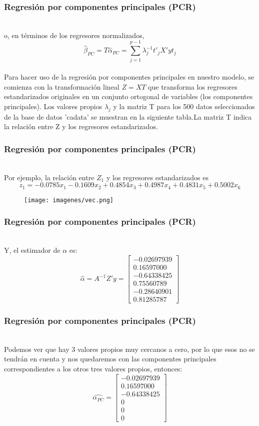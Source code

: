 \documentclass[12pt]{beamer}
\begin{document}
\begin{frame}
\frametitle{Regresión por componentes principales (PCR)}
~\\ o, en términos de los regresores normalizados,
$$\hat{\beta}_{PC}=T\hat{\alpha}_{PC}=\sum\limits_{j=1}^{p-1}\lambda_{j}^{-1}t'_{j}X'yt_{j}$$
~\\Para hacer uso de la regresión por componentes principales en nuestro modelo, se comienza con la transformación lineal $Z=XT$ que transforma los regresores estandarizados originales en un conjunto ortogonal de variables (los componentes principales). Los valores propios $\lambda_{j}$ y la matriz T para los 500 datos seleccionados de la base de datos 'cadata' se muestran en la siguiente tabla.La matriz T indica la relación entre Z y los regresores estandarizados. 
\end{frame}

\begin{frame}
\frametitle{Regresión por componentes principales (PCR)}
~\\Por ejemplo, la relación entre $Z_{1}$ y los regresores estandarizados es 
$$z_{1}=-0.0785x_{1}-0.1609x_{2}+0.4854x_{3}+0.4987x_{4}+0.4831x_{5}+0.5002x_{6}$$
\begin{figure}[!h]
    \begin{center}
        \texttt{[image: imagenes/vec.png]}
        \label{fig:Densidad}
    \end{center}
\end{figure}
\end{frame}

\begin{frame}
\frametitle{Regresión por componentes principales (PCR)}
~\\Y, el estimador de $\alpha$ es:
 $$\hat{\alpha}=A^{-1}Z'y=\left[\begin{matrix}
 -0.02697939 \\ 
 0.16597000 \\ 
 -0.64338425 \\ 
 0.75560789 \\ 
 -0.28640901 \\ 
 0.81285787
 \end{matrix}\right]$$
\end{frame}

\begin{frame}
\frametitle{Regresión por componentes principales (PCR)}
~\\Podemos ver que hay 3 valores propios muy cercanos a cero, por lo que esos no se tendrán en cuenta y nos quedaremos con las componentes principales correspondientes a los otros tres valores propios, entonces:
$$\hat{\alpha_{PC}}=\left[\begin{matrix}
 -0.02697939 \\ 
 0.16597000 \\ 
 -0.64338425 \\ 
0 \\ 
 0 \\ 
 0
 \end{matrix}\right]$$
\end{frame}
\end{document}
